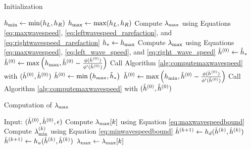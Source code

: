 \begin{algorithm}[htb]
\caption{Initialization}
\begin{algorithmic}
\State $h_{\text{min}}\gets \min(h_L,h_R)$
\State $h_{\text{max}}\gets \max(h_L,h_R)$
 
  \State Compute $\lambda_{\text{max}}$ using Equations
    \eqref{eq:maxwavespeed},
    \eqref{eq:leftwavespeed_rarefaction}, and \eqref{eq:rightwavespeed_rarefaction}
  \State \Return
\EndIf
{} 
  \State $h_*\gets h_{\text{max}}$
  \State Compute $\lambda_{\text{max}}$ using Equations
    \eqref{eq:maxwavespeed}, \eqref{eq:left_wave_speed},
    and \eqref{eq:right_wave_speed}
  \State \Return
{} 
  \State $\hat{h}^{(0)}\gets \tilde{h}_*$
  \State $\check{h}^{(0)}\gets \max\left(h_{\text{max}},\hat{h}^{(0)}
    - \frac{\phi(\hat{h}^{(0)})}{\phi'(\hat{h}^{(0)})}\right)$
  \State Call Algorithm \ref{alg:computemaxwavespeed}
    with $(\check{h}^{(0)},\hat{h}^{(0)})$
  \State \Return
\Else {}
  \State $\hat{h}^{(0)}\gets \min\left(h_{\text{max}},\tilde{h}_*\right)$
  \State $\check{h}^{(0)}\gets \max\left(h_{\text{min}},\hat{h}^{(0)}
    - \frac{\phi(\hat{h}^{(0)})}{\phi'(\hat{h}^{(0)})}\right)$
  \State Call Algorithm \ref{alg:computemaxwavespeed}
    with $(\check{h}^{(0)},\hat{h}^{(0)})$
  \State \Return
\EndIf
\end{algorithmic}
\end{algorithm}

\begin{algorithm}[htb]
\caption{Computation of $\lambda_{\text{max}}$}
\label{alg:computemaxwavespeed}
\begin{algorithmic}
\State Input: $(\check{h}^{(0)},\hat{h}^{(0)},\epsilon)$
\Loop
  \State Compute $\lambda_{\text{max}}[k]$ using Equation \eqref{eq:maxwavespeedbound}
  \State Compute $\lambda_{\text{min}}^{(k)}$ using Equation \eqref{eq:minwavespeedbound}
      \State \Return
    \EndIf
  \EndIf
    \State \Return
  \EndIf
  \State $\check{h}^{(k+1)}\gets h_d(\check{h}^{(k)},\hat{h}^{(k)})$
  \State $\hat{h}^{(k+1)}\gets h_u(\check{h}^{(k)},\hat{h}^{(k)})$
\EndLoop
\State $\lambda_{\text{max}}\gets \lambda_{\text{max}}[k]$
\end{algorithmic}
\end{algorithm}

